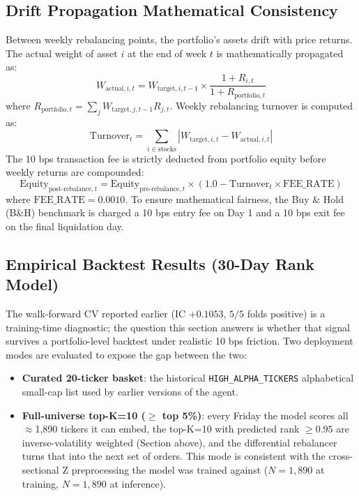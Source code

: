\documentclass[10pt,journal,compsoc]{IEEEtran}
\begin{document}
\subsection{Drift Propagation Mathematical Consistency}
Between weekly rebalancing points, the portfolio's assets drift with price returns. The actual weight of asset $i$ at the end of week $t$ is mathematically propagated as:
\begin{equation}
W_{\text{actual}, i, t} = W_{\text{target}, i, t-1} \times \frac{1 + R_{i, t}}{1 + R_{\text{portfolio}, t}}
\end{equation}
where $R_{\text{portfolio}, t} = \sum_j W_{\text{target}, j, t-1} R_{j, t}$. Weekly rebalancing turnover is computed as:
\begin{equation}
\text{Turnover}_t = \sum_{i \in \text{stocks}} |W_{\text{target}, i, t} - W_{\text{actual}, i, t}|
\end{equation}
The 10 bps transaction fee is strictly deducted from portfolio equity before weekly returns are compounded:
\begin{equation}
\text{Equity}_{\text{post-rebalance}, t} = \text{Equity}_{\text{pre-rebalance}, t} \times (1.0 - \text{Turnover}_t \times \text{FEE\_RATE})
\end{equation}
where $\text{FEE\_RATE} = 0.0010$. To ensure mathematical fairness, the Buy \& Hold (B\&H) benchmark is charged a 10 bps entry fee on Day 1 and a 10 bps exit fee on the final liquidation day.

\subsection{Empirical Backtest Results (30-Day Rank Model)}
The walk-forward CV reported earlier (IC $+0.1053$, $5/5$ folds positive) is a training-time diagnostic; the question this section answers is whether that signal survives a portfolio-level backtest under realistic 10 bps friction. Two deployment modes are evaluated to expose the gap between the two:

\begin{itemize}\itemsep0pt
  \item \textbf{Curated 20-ticker basket}: the historical \texttt{HIGH\_ALPHA\_TICKERS} alphabetical small-cap list used by earlier versions of the agent.
  \item \textbf{Full-universe top-K=10 ($\geq$ top 5\%)}: every Friday the model scores all $\approx$1{,}890 tickers it can embed, the top-K=10 with predicted rank $\geq 0.95$ are inverse-volatility weighted (Section above), and the differential rebalancer turns that into the next set of orders. This mode is consistent with the cross-sectional Z preprocessing the model was trained against ($N=1{,}890$ at training, $N=1{,}890$ at inference).
\end{itemize}
\end{document}
